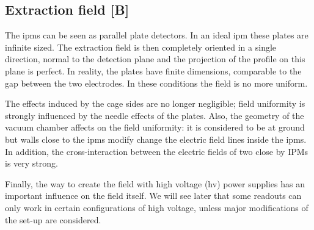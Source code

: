 \begin{refsection}
  \section{Extraction field [B]}
  
  The \acrshort{ipm}s can be seen as parallel plate detectors. In an ideal \acrshort{ipm} these plates are infinite sized. The extraction field is then completely oriented in a single direction, normal to the detection plane and the projection of the profile on this plane is perfect. In reality, the plates have finite dimensions, comparable to the gap between the two electrodes. In these conditions the field is no more uniform.

  The effects induced by the cage sides are no longer negligible; field uniformity is strongly influenced by the needle effects of the plates.
  Also, the geometry of the vacuum chamber affects on the field uniformity: it is considered to be at ground but walls close to the \acrshort{ipm}s modify change the electric field lines inside the \acrshort{ipm}s. In addition, the cross-interaction between the electric fields of two close by IPMs is very strong.

  Finally, the way to create the field with high voltage (\acrshort{hv}) power supplies has an important influence on the field itself. We will see later that some readouts can only work in certain configurations of high voltage, unless major modifications of the set-up are considered.


\end{refsection}
